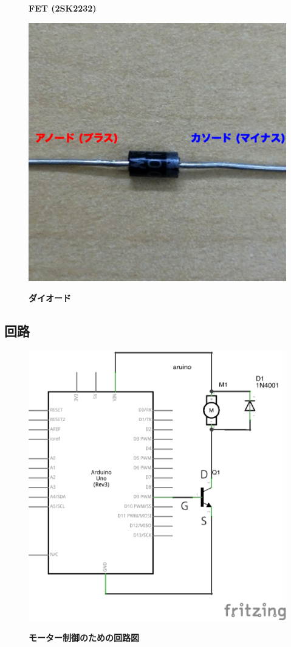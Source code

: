 \documentclass[11pt,a4paper]{jarticle}
\begin{document}
\begin{figure}[h!]
\begin{minipage}{0.32\columnwidth}
  \begin{center}
   \textbf{FET (2SK2232)}
  \end{center}
 \end{minipage}
 \begin{minipage}{0.32\columnwidth}
  \centering
  \includegraphics[width=\columnwidth]{img/diode.eps}
  \begin{center}
   \textbf{ダイオード}
  \end{center}
 \end{minipage}
\end{figure}

\newpage

\subsection*{回路}
\begin{figure}[h!]
 \centering
 \includegraphics[width=0.5\columnwidth]{img/motor_control.eps}
 \begin{center}
  \textbf{モーター制御のための回路図}
 \end{center}
\end{figure}
\end{document}
